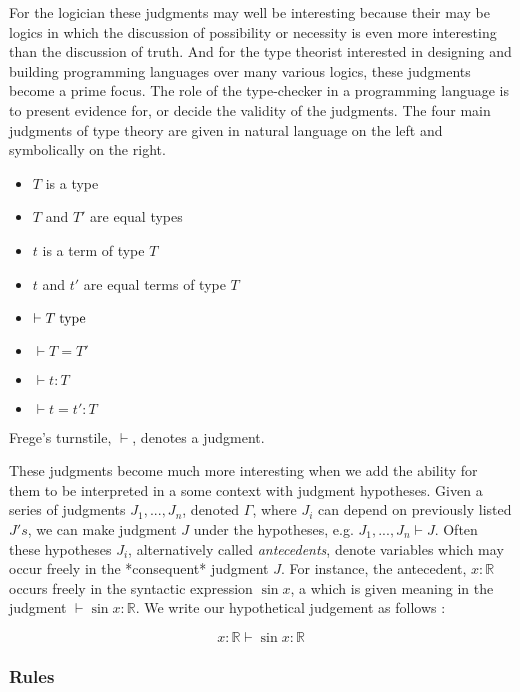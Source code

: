 For the logician these judgments may well be interesting because their may be
logics in which the discussion of possibility or necessity is even more
interesting than the discussion of truth. And for the type theorist interested
in designing and building programming languages over many various logics, these
judgments become a prime focus. The role of the type-checker in a programming
language is to present evidence for, or decide the validity of the judgments.
The four main judgments of type theory are given in natural language on the left
and symbolically on the right.

\begin{multicols}{2}
\begin{itemize}
\item $T$ is a type
\item $T$ and $T'$ are equal types
\item $t$ is a term of type $T$
\item $t$ and $t'$ are equal terms of type $T$
\item $\vdash T \; {\rm type}$
\item $\vdash T = T'$
\item $\vdash t:T$
\item $\vdash t = t':T$
\end{itemize}
\end{multicols}

Frege's turnstile, $\vdash$, denotes a judgment.

These judgments become much more interesting when we add the ability for them to
be interpreted in a some context with judgment hypotheses. Given a series of
judgments $J_1,...,J_n$, denoted $\Gamma$, where $J_i$ can depend on previously
listed $J's$, we can make judgment $J$ under the hypotheses, e.g. $J_1,...,J_n
\vdash J$. Often these hypotheses $J_i$, alternatively called \emph{antecedents},
denote variables which may occur freely in the *consequent* judgment $J$. For
instance, the antecedent, $x : \mathbb{R}$ occurs freely in the syntactic
expression $\sin x$, a which is given meaning in the judgment $\vdash \sin x { :
} \mathbb{R}$. We write our hypothetical judgement as follows :

$$x : \mathbb{R} \vdash \sin x : \mathbb{R}$$



\subsubsection{Rules}

